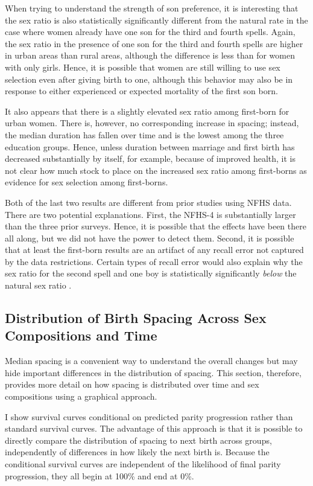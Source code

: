 \documentclass[12pt,letterpaper]{article}
\begin{document}
When trying to understand the strength of son preference, it is interesting
that the sex ratio is also statistically significantly different
from the natural rate in the case where women already have one
son for the third and fourth spells.
Again, the sex ratio in the presence of one son for the third and
fourth spells are higher in urban areas than rural areas, although
the difference is less than for women with only girls.
Hence, it is possible that women are still willing to use sex selection
even after giving birth to one, although this behavior may also 
be in response to either experienced
or expected mortality of the first son born.

It also appears that there is a slightly elevated sex ratio among 
first-born for urban women. 
There is, however, no corresponding increase in spacing; instead,
the median duration has fallen over time and is the lowest among
the three education groups.
Hence, unless duration between marriage and first birth has decreased 
substantially by itself, for example, because of improved health, it
is not clear how much stock to place on the increased sex ratio
among first-borns as evidence for sex selection among first-borns.

Both of the last two results are different from prior studies using NFHS data.
There are two potential explanations.
First, the NFHS-4 is substantially larger than the three prior surveys.
Hence, it is possible that the effects have been there all along, but 
we did not have the power to detect them.
Second, it is possible that at least the first-born results are an
artifact of any recall error not captured by the data restrictions.
Certain types of recall error would also explain why the sex ratio for
the second spell and one boy is statistically significantly \emph{below} 
the natural sex ratio \citep{Portner2018b}.


\subsection{Distribution of Birth Spacing Across Sex Compositions and Time}

Median spacing is a convenient way to understand the overall changes but
may hide important differences in the distribution of spacing.
This section, therefore, provides more detail on how spacing is distributed
over time and sex compositions using a graphical approach.

I show survival curves conditional on predicted parity progression rather than
standard survival curves. 
The advantage of this approach is that it is possible to directly compare 
the distribution of spacing to next birth across groups, independently of 
differences in how likely the next birth is.
Because the conditional survival curves are independent of the likelihood
of final parity progression, they all begin at 100\% and end at 0\%.
\end{document}
